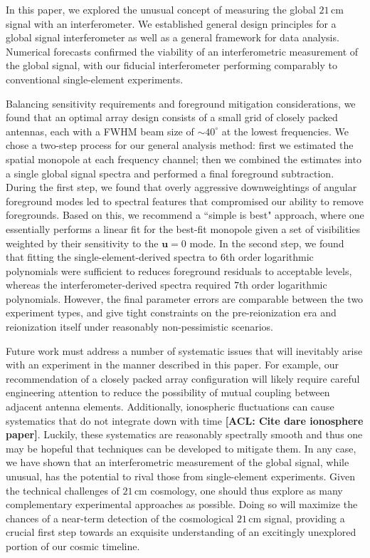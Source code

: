 \documentclass[twocolumn,apj,numberedappendix]{emulateapj}
\newcommand{\acl}[1]{{\color{red} \textbf{[ACL:  #1]}}}
\begin{document}
In this paper, we explored the unusual concept of measuring the global $21\,\textrm{cm}$ signal with an interferometer. We established general design principles for a global signal interferometer as well as a general framework for data analysis. Numerical forecasts confirmed the viability of an interferometric measurement of the global signal, with our fiducial interferometer performing comparably to conventional single-element experiments.

Balancing sensitivity requirements and foreground mitigation considerations, we found that an optimal array design consists of a small grid of closely packed antennas, each with a FWHM beam size of $\sim40^\circ$ at the lowest frequencies. We chose a two-step process for our general analysis method: first we estimated the spatial monopole at each frequency channel; then we combined the estimates into a single global signal spectra and performed a final foreground subtraction. During the first step, we found that overly aggressive downweightings of angular foreground modes led to spectral features that compromised our ability to remove foregrounds. Based on this, we recommend a ``simple is best" approach, where one essentially performs a linear fit for the best-fit monopole given a set of visibilities weighted by their sensitivity to the $\mathbf{u}=0$ mode. In the second step, we found that fitting the single-element-derived spectra to $6$th order logarithmic polynomials were sufficient to reduces foreground residuals to acceptable levels, whereas the interferometer-derived spectra required $7$th order logarithmic polynomials. However, the final parameter errors are comparable between the two experiment types, and give tight constraints on the pre-reionization era and reionization itself under reasonably non-pessimistic scenarios.

Future work must address a number of systematic issues that will inevitably arise with an experiment in the manner described in this paper. For example, our recommendation of a closely packed array configuration will likely require careful engineering attention to reduce the possibility of mutual coupling between adjacent antenna elements. Additionally, ionospheric fluctuations can cause systematics that do not integrate down with time \acl{Cite dare ionosphere paper}. Luckily, these systematics are reasonably spectrally smooth and thus one may be hopeful that techniques can be developed to mitigate them. In any case, we have shown that an interferometric measurement of the global signal, while unusual, has the potential to rival those from single-element experiments. Given the technical challenges of $21\,\textrm{cm}$ cosmology, one should thus explore as many complementary experimental approaches as possible. Doing so will maximize the chances of a near-term detection of the cosmological $21\,\textrm{cm}$ signal, providing a crucial first step towards an exquisite understanding of an excitingly unexplored portion of our cosmic timeline.
\end{document}
